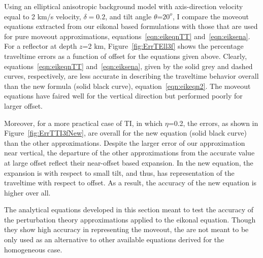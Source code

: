 Using an elliptical anisotropic background model with axis-direction
velocity equal to 2 km/s velocity, $\delta=0.2$, and tilt angle $\theta$=$20^{o}$, 
I compare  the moveout equations extracted from our eikonal based formulations with
those that are used for pure moveout approximations, equations~\ref{eqn:eikeqnTT} and~\ref{eqn:eiksena}. 
For a reflector at depth $z$=2 km, Figure~\ref{fig:ErrTEll3f} shows the percentage traveltime errors as a function of
offset for the equations given above. Clearly, equations~\ref{eqn:eikeqnTT} and~\ref{eqn:eiksena}, given by the solid grey and
dashed curves, respectively,
 are less accurate in describing the traveltime behavior overall than
the new formula (solid black curve),
equation~\ref{eqn:eikeqn2}. The moveout equations have faired well
for the vertical direction but performed poorly for larger offset.

Moreover, for a more practical case of TI, in which $\eta$=0.2, the errors, as shown in Figure~\ref{fig:ErrTTI3fNew}, 
are   overall for the new equation (solid black curve) than the other
approximations. Despite the larger error of our approximation near vertical, the departure
of the other approximations from the accurate value at large offset
reflect their near-offset based expansion. In the new equation, the
expansion is with respect to small tilt, and thus, has  representation of the traveltime with respect to
offset. As a result, the accuracy of the new equation is higher over all.

The analytical equations developed in this section  
 meant to test the accuracy of the perturbation theory approximations applied to the eikonal
equation. Though they show 
high accuracy in representing the moveout, the  are not meant to be
only used as  an alternative to other available equations derived for
the homogeneous case. 

